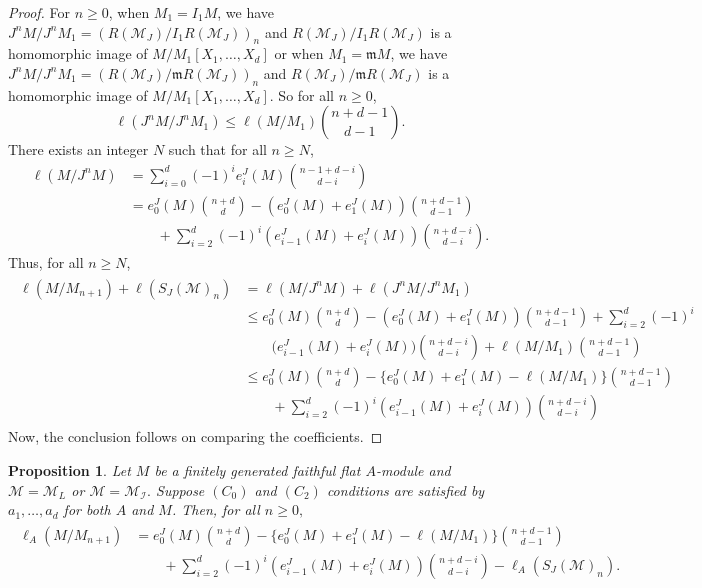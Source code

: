 \documentclass[10pt,a4paper]{amsart}
\newtheorem{proposition}{Proposition}
\def\I{{\mathcal I}}
\def\M{{\mathcal M}}
\newcommand{\m}{\mathfrak m}
\begin{document}
\begin{proof}
	For $n\geq 0$, when $M_1=I_1M$, we have $J^nM/J^n M_1= (R(\M_J)/I_1 R(\M_J))_n$ and $R(\M_J)/I_1 R(\M_J)$ is a homomorphic image of $M/M_1[X_1,\ldots,X_d]$ or when $M_1=\m M$, we have $J^nM/J^n M_1= (R(\M_J)/\m R(\M_J))_n$ and $R(\M_J)/\m R(\M_J)$ is a homomorphic image of $M/M_1[X_1,\ldots,X_d]$. So for all $n\geq 0$, 
	\begin{equation}
		\ell(J^nM/J^{n} M_1)\leq \ell(M/M_1)\binom{n+d-1}{d-1}.\label{equation:step-hilbFunfibercone}
	\end{equation}
	There exists an integer $N$ such that for all $n\geq N$,
	\begin{align*}
		\ell(M/J^nM)&=\mathop\sum\limits_{i=0}^d (-1)^ie_i^J(M)\binom{n-1+d-i}{d-i}\\
		&=e_0^J(M)\binom{n+d}{d}-(e_0^J(M)+e_1^J(M))\binom{n+d-1}{d-1}\\
		&\qquad+\mathop\sum\limits_{i=2}^d(-1)^i(e_{i-1}^J(M)+e_i^J(M))\binom{n+d-i}{d-i}.
	\end{align*}
	Thus, for all $n\geq N$,
	\begin{align*}
		\begin{split}
			\ell(M/M_{n+1})+\ell(S_J(\M)_n)&=\ell(M/J^nM)+\ell(J^nM/J^n M_1)\\
			&\leq e_0^J(M)\binom{n+d}{d}-(e_0^J(M)+e_1^J(M))\binom{n+d-1}{d-1}+\mathop\sum\limits_{i=2}^d(-1)^i\\
			&\qquad\big(e_{i-1}^J(M)+ e_i^J(M)\big)\binom{n+d-i}{d-i}+\ell(M/M_1)\binom{n+d-1}{d-1}\\
			&\leq e_0^J(M)\binom{n+d}{d}-\Big\{ e_0^J(M)+e_1^J(M)-\ell(M/M_1)\Big\}\binom{n+d-1}{d-1}\\
			&\qquad+\mathop\sum\limits_{i=2}^d(-1)^i(e_{i-1}^J(M)+e_i^J(M))\binom{n+d-i}{d-i} 
		\end{split}
	\end{align*}
	Now, the conclusion  follows on comparing the coefficients.
\end{proof}
\begin{proposition}\label{proposition-2.4}    Let $M$ be a finitely generated faithful flat $A$-module and $\M=\M_L$ or $\M=\M_\I.$ Suppose $(C_0)$ and $(C_2)$ conditions are satisfied by $a_1,\ldots,a_d$ for both $A$ and $M$. Then,  for all $n\geq 0,$ 
	\begin{align}\label{newlabel-eq-1}
		\begin{split}
			\ell_A(M/M_{n+1})&= e_0^J(M)\binom{n+d}{d}-\Big\{ e_0^J(M)+e_1^J(M)-\ell(M/M_1)\Big\}\binom{n+d-1}{d-1}\\
			&\qquad+\mathop\sum\limits_{i=2}^d(-1)^i(e_{i-1}^J(M)+e_i^J(M))\binom{n+d-i}{d-i}-\ell_A(S_J(\M)_{n}).
		\end{split}
	\end{align}
\end{proposition}
\end{document}
